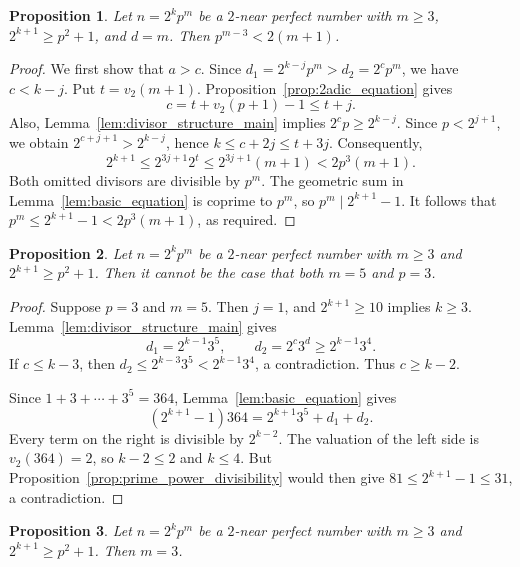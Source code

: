 \documentclass[10pt]{article}
\newtheorem{proposition}{Proposition}
\theoremstyle{definition}
\begin{document}
\begin{proposition}
\label{prop:bound_d_m}
Let $n=2^kp^m$ be a $2$-near perfect number with $m\geq 3$, $2^{k+1}\geq p^2+1$, and $d=m$. Then $p^{m-3}<2(m+1)$.
\end{proposition}

\begin{proof} We first show that $a>c$.
Since $d_1=2^{k-j}p^m>d_2=2^cp^m$, we have $c<k-j$.
Put $t=v_2(m+1)$. Proposition~\ref{prop:2adic_equation} gives
\[
c=t+v_2(p+1)-1\le t+j.
\]
Also, Lemma~\ref{lem:divisor_structure_main} implies
$2^cp\ge2^{k-j}$. Since $p<2^{j+1}$, we obtain
$2^{c+j+1}>2^{k-j}$, hence $k\le c+2j\le t+3j$.
Consequently,
\[
2^{k+1}\le2^{3j+1}2^t\le2^{3j+1}(m+1)<2p^3(m+1).
\]
Both omitted divisors are divisible by $p^m$. The geometric sum in
Lemma~\ref{lem:basic_equation} is coprime to $p^m$, so
$p^m\mid2^{k+1}-1$. It follows that
$p^m\le2^{k+1}-1<2p^3(m+1)$, as required.
\end{proof}


\begin{proposition}\label{prop:not_p3_m5}
Let $n=2^kp^m$ be a $2$-near perfect number with $m\geq 3$ and $2^{k+1}\geq p^2+1$. Then it cannot be the case that both $m=5$ and $p=3$.
\end{proposition}

\begin{proof}
Suppose $p=3$ and $m=5$. Then $j=1$, and
$2^{k+1}\ge10$ implies $k\ge3$.
Lemma~\ref{lem:divisor_structure_main} gives
\[
d_1=2^{k-1}3^5,\qquad d_2=2^c3^d\ge2^{k-1}3^4.
\]
If $c\le k-3$, then
$d_2\le2^{k-3}3^5<2^{k-1}3^4$, a contradiction.
Thus $c\ge k-2$.

Since $1+3+\cdots+3^5=364$, Lemma~\ref{lem:basic_equation} gives
\[
(2^{k+1}-1)364=2^{k+1}3^5+d_1+d_2.
\]
Every term on the right is divisible by $2^{k-2}$. The valuation
of the left side is $v_2(364)=2$, so $k-2\le2$ and $k\le4$.
But Proposition~\ref{prop:prime_power_divisibility} would then give
$81\le2^{k+1}-1\le31$, a contradiction.
\end{proof}

\begin{proposition}\label{prop:m_equals_3}
Let $n=2^kp^m$ be a $2$-near perfect number with $m\geq 3$ and $2^{k+1}\geq p^2+1$. Then $m=3$.
\end{proposition}
\end{document}
